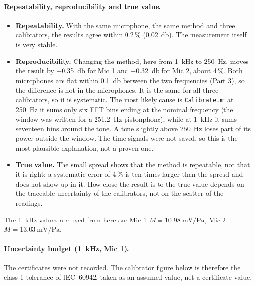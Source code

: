 \documentclass[a4paper,10pt]{article}
\newcommand{\file}[1]{\nolinkurl{#1}}
\begin{document}
\paragraph{Repeatability, reproducibility and true value.}
\begin{itemize}
\item \textbf{Repeatability.} With the same microphone, the same method and three
calibrators, the results agree within 0.2\,\% (\SI{0.02}{\decibel}). The measurement
itself is very stable.
\item \textbf{Reproducibility.} Changing the method, here from \SI{1}{\kilo\hertz} to
\SI{250}{\hertz}, moves the result by \SI{-0.35}{\decibel} for Mic 1 and
\SI{-0.32}{\decibel} for Mic 2, about 4\,\%. Both microphones are flat within
\SI{0.1}{\decibel} between the two frequencies (Part 3), so the difference is not in the
microphones. It is the same for all three calibrators, so it is systematic. The most
likely cause is \file{Calibrate.m}: at \SI{250}{\hertz} it sums only six FFT bins ending
at the nominal frequency (the window was written for a \SI{251.2}{\hertz} pistonphone),
while at \SI{1}{\kilo\hertz} it sums seventeen bins around the tone. A tone slightly
above \SI{250}{\hertz} loses part of its power outside the window. The time signals were
not saved, so this is the most plausible explanation, not a proven one.
\item \textbf{True value.} The small spread shows that the method is repeatable, not that
it is right: a systematic error of 4\,\% is ten times larger than the spread and does
not show up in it. How close the result is to the true value depends on the traceable
uncertainty of the calibrators, not on the scatter of the readings.
\end{itemize}
The \SI{1}{\kilo\hertz} values are used from here on: Mic 1 $M=\SI{10.98}{\milli\volt\per\pascal}$,
Mic 2 $M=\SI{13.03}{\milli\volt\per\pascal}$.

\paragraph{Uncertainty budget (\SI{1}{\kilo\hertz}, Mic 1).}
The certificates were not recorded. The calibrator figure below is therefore the class-1
tolerance of IEC~60942, taken as an assumed value, not a certificate value.
\end{document}
